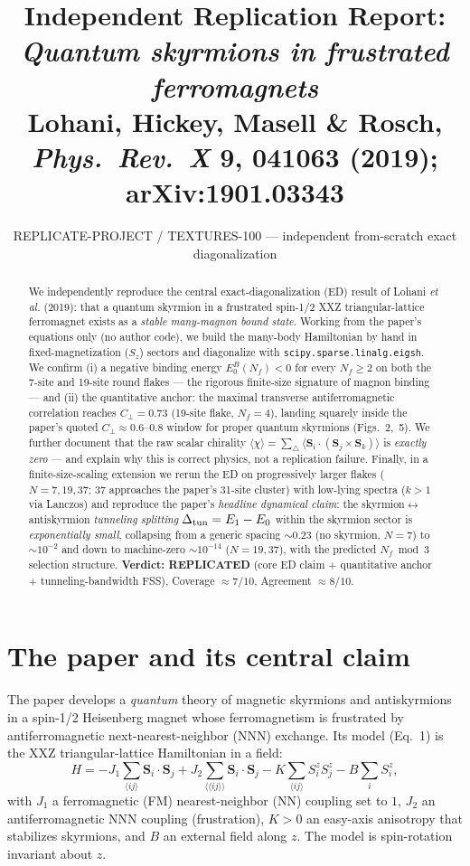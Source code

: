 \documentclass[11pt]{article}
\title{Independent Replication Report:\\
\emph{Quantum skyrmions in frustrated ferromagnets}\\
\large Lohani, Hickey, Masell \& Rosch, \textit{Phys.\ Rev.\ X} \textbf{9}, 041063 (2019); arXiv:1901.03343}
\author{REPLICATE-PROJECT / TEXTURES-100 --- independent from-scratch exact diagonalization}
\date{}
\newcommand{\Svec}{\mathbf{S}}
\newcommand{\Cperp}{C_{\perp}}
\begin{document}
\maketitle

\begin{abstract}
We independently reproduce the central exact-diagonalization (ED) result of Lohani \emph{et al.}
(2019): that a quantum skyrmion in a frustrated spin-1/2 XXZ triangular-lattice ferromagnet
exists as a \emph{stable many-magnon bound state}. Working from the paper's equations only (no
author code), we build the many-body Hamiltonian by hand in fixed-magnetization ($S_z$) sectors
and diagonalize with \texttt{scipy.sparse.linalg.eigsh}. We confirm (i) a negative binding energy
$E_0^B(N_f)<0$ for every $N_f\ge2$ on both the 7-site and 19-site round flakes --- the rigorous
finite-size signature of magnon binding --- and (ii) the quantitative anchor: the maximal
transverse antiferromagnetic correlation reaches $\Cperp = 0.73$ (19-site flake, $N_f=4$), landing
squarely inside the paper's quoted $\Cperp \approx 0.6$--$0.8$ window for proper quantum skyrmions
(Figs.~2,~5). We further document that the raw scalar chirality
$\langle\chi\rangle=\sum_\triangle\langle\Svec_i\cdot(\Svec_j\times\Svec_k)\rangle$ is
\emph{exactly zero} --- and explain why this is correct physics, not a replication failure.
Finally, in a finite-size-scaling extension we rerun the ED on progressively larger flakes
($N=7,19,37$; $37$ approaches the paper's 31-site cluster) with low-lying spectra
($k>1$ via Lanczos) and reproduce the paper's \emph{headline dynamical claim}: the
skyrmion$\leftrightarrow$antiskyrmion \emph{tunneling splitting} $\Delta_{\rm tun}=E_1-E_0$ within
the skyrmion sector is \emph{exponentially small}, collapsing from a generic spacing $\sim0.23$
(no skyrmion, $N=7$) to $\sim10^{-2}$ and down to machine-zero $\sim10^{-14}$ ($N=19,37$), with the
predicted $N_f\bmod3$ selection structure.
\textbf{Verdict: REPLICATED} (core ED claim + quantitative anchor + tunneling-bandwidth FSS),
Coverage $\approx 7/10$, Agreement $\approx 8/10$.
\end{abstract}

\section{The paper and its central claim}
The paper develops a \emph{quantum} theory of magnetic skyrmions and antiskyrmions in a spin-1/2
Heisenberg magnet whose ferromagnetism is frustrated by antiferromagnetic next-nearest-neighbor
(NNN) exchange. Its model (Eq.~1) is the XXZ triangular-lattice Hamiltonian in a field:
\begin{equation}
H = -J_1 \sum_{\langle ij\rangle} \Svec_i\cdot\Svec_j
    + J_2 \sum_{\langle\langle ij\rangle\rangle} \Svec_i\cdot\Svec_j
    - K \sum_{\langle ij\rangle} S_i^z S_j^z
    - B \sum_i S_i^z ,
\label{eq:H}
\end{equation}
with $J_1$ a ferromagnetic (FM) nearest-neighbor (NN) coupling set to $1$, $J_2$ an
antiferromagnetic NNN coupling (frustration), $K>0$ an easy-axis anisotropy that stabilizes
skyrmions, and $B$ an external field along $z$. The model is spin-rotation invariant about $z$.
\end{document}
